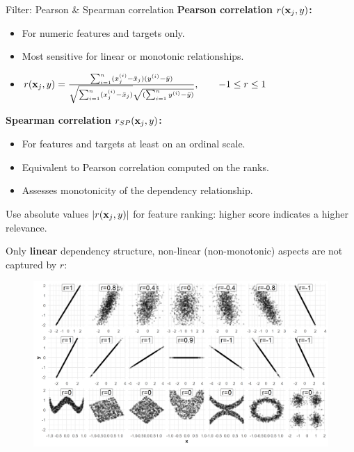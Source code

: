 \documentclass[11pt,compress,t,notes=noshow, xcolor=table]{beamer}
\begin{document}
  \begin{vbframe}{Filter: Pearson \& Spearman correlation}
  \textbf{Pearson correlation $r(\mathbf{x}_j, y)$: }
  \begin{itemize}
    \item For numeric features and targets only.
    \item Most sensitive for linear or monotonic relationships.
    \item $ r(\mathbf{x}_j, y) = \frac{\sum_{i=1}^n (x^{(i)}_j - \bar{x}_j) (y^{(i)} - \bar{y})}{\sqrt{\sum_{i=1}^n (x^{(i)}_j - \bar{x}_j)} \sqrt{(\sum_{i=1}^n y^{(i)} - \bar{y})}},\qquad -1 \le r \le 1$
  \end{itemize}
  \textbf{Spearman correlation $r_{SP}(\mathbf{x}_j, y)$:}
  \begin{itemize}
    \item For features and targets at least on an ordinal scale.
    \item Equivalent to Pearson correlation computed on the ranks.
    \item Assesses monotonicity of the dependency relationship.
  \end{itemize}
  \lz
  Use absolute values $|r(\mathbf{x}_j, y)|$ for feature ranking: higher score indicates a higher relevance.

  \framebreak

  Only \textbf{linear} dependency structure, non-linear (non-monotonic) aspects are not captured by $r$:

  \lz

  \begin{figure}
    \includegraphics {figure_man/chunk2_filter_correlation.png}
  \end{figure}


\end{vbframe}
\end{document}
